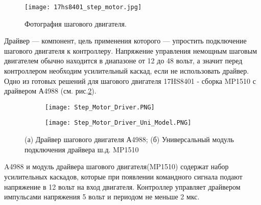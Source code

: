 \begin{figure}[ht]
	\centering
     \texttt{[image: 17hs8401\_step\_motor.jpg]}
	\caption{Фотография шагового двигателя.}
	\label{fig:17hs8401_step_motor}
\end{figure}
Драйвер --- компонент, цель применения которого --- упростить подключение шагового двигателя к контроллеру. Напряжение управления немощным шаговым двигателем обычно находится в диапазоне от 12 до 48 вольт, а значит перед контроллером необходим усилительный каскад, если не использовать драйвер. Одно из готовых решений для шагового двигателя 17HS8401 - сборка MP1510 с драйвером А4988 (см. рис.\ref{fig:Step_Motor_Driver}).
\begin{figure}[h]
    \centering
    \begin{subfigure}[b]{0.45\textwidth}
    \centering
        \texttt{[image: Step\_Motor\_Driver.PNG]}
        \caption{}
    \end{subfigure}
    \begin{subfigure}[b]{0.45\textwidth}
    \centering
        \texttt{[image: Step\_Motor\_Driver\_Uni\_Model.PNG]}
        \caption{}
    \end{subfigure}
    \caption{(а) Драйвер шагового двигателя А4988;
    (б) Универсальный модуль подключения драйвера ш.д. MP1510}
    \label{fig:Step_Motor_Driver}
\end{figure}
A4988 и модуль драйвера шагового двигателя(MP1510) содержат набор усилительных каскадов, которые при появлении командного сигнала подают напряжение в 12 вольт на вход двигателя. Контроллер управляет драйвером импульсами напряжения 5 вольт и периодом не меньше 2 мкс.

